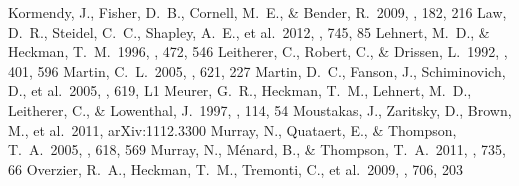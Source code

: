 \documentclass[apj]{emulateapj}
\begin{document}
\begin{thebibliography}{}
 Kormendy, J., Fisher, D.~B.,
  Cornell, M.~E., \& Bender, R.\ 2009, \apjs, 182, 216
 Law, D.~R., Steidel, C.~C., Shapley,
  A.~E., et al.\ 2012, \apj, 745, 85
 Lehnert, M.~D., \& Heckman,
  T.~M.\ 1996, \apj, 472, 546
 Leitherer, C., Robert, C., \&
  Drissen, L.\ 1992, \apj, 401, 596
 Martin, C.~L.\ 2005, \apj, 621, 227
 Martin, D.~C., Fanson, J.,
  Schiminovich, D., et al.\ 2005, \apjl, 619, L1
 Meurer, G.~R., Heckman, T.~M.,
  Lehnert, M.~D., Leitherer, C., \& Lowenthal, J.\ 1997, \aj, 114, 54
 Moustakas, J., Zaritsky, D.,
  Brown, M., et al.\ 2011, arXiv:1112.3300
 Murray, N., Quataert, E., \&
  Thompson, T.~A.\ 2005, \apj, 618, 569
 Murray, N., M{\'e}nard, B., \&
  Thompson, T.~A.\ 2011, \apj, 735, 66
 Overzier, R.~A., Heckman,
  T.~M., Tremonti, C., et al.\ 2009, \apj, 706, 203

\end{thebibliography}
\end{document}
